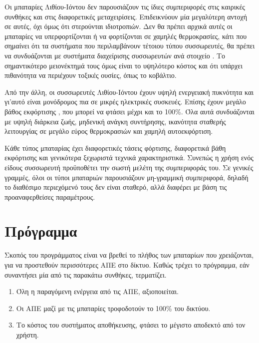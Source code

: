 \documentclass[12pt]{report}
\begin{document}
Οι μπαταρίες Λιθίου-Ιόντου δεν παρουσιάζουν τις ίδιες συμπεριφορές στις καιρικές συνθήκες και στις διαφορετικές μεταχειρίσεις. Επιδεικνύουν μία μεγαλύτερη αντοχή σε αυτές, όχι όμως ότι στερούνται ιδιοτροπιών. 
Δεν θα πρέπει αρχικά αυτές οι μπαταρίες να υπερφορτίζονται ή να φορτίζονται σε χαμηλές θερμοκρασίες, κάτι που σημαίνει ότι τα συστήματα που περιλαμβάνουν τέτοιου τύπου συσσωρευτές, θα πρέπει να συνδυάζονται με συστήματα
διαχείρισης συσσωρευτών ανά στοιχείο {}. Το σημαντικότερο μειονέκτημά τους όμως είναι το υψηλότερο κόστος και ότι υπάρχει πιθανότητα να περιέχουν τοξικές ουσίες, όπως το κοβάλτιο.

Από την άλλη, οι συσσωρευτές Λιθίου-Ιόντου έχουν υψηλή ενεργειακή πυκνότητα και γι'αυτό είναι μονόδρομος πια σε μικρές ηλεκτρικές συσκευές. Επίσης έχουν μεγάλο βάθος εκφόρτισης {}, που μπορεί
να φτάσει μέχρι και το 100\%. Όλα αυτά συνδυάζονται με υψηλή διάρκεια ζωής, μηδενική ανάγκη συντήρησης, ικανότητα σταθερής λειτουργίας σε μεγάλο εύρος θερμοκρασιών και χαμηλή αυτοεκφόρτιση.

Κάθε τύπος μπαταρίας έχει διαφορετικές τάσεις φόρτισης, διαφορετικά βάθη εκφόρτισης και γενικότερα ξεχωριστά τεχνικά χαρακτηριστικά. Συνεπώς η χρήση ενός είδους συσσωρευτή προϋποθέτει την σωστή μελέτη της συμπεριφοράς του.
Σε γενικές γραμμές, όλοι οι τύποι μπαταριών παρουσιάζουν μη-γραμμική συμπεριφορά, δηλαδή το διαθέσιμο περιεχόμενό τους δεν είναι σταθερό, αλλά διαφέρει με βάση τις προαναφερθείσες παραμέτρους.

\chapter{Πρόγραμμα}
Σκοπός του προγράμματος είναι να βρεθεί το πλήθος των μπαταρίων που χρειάζονται, για να προστεθούν περισσότερες ΑΠΕ στο δίκτυο. Καθώς τρέχει το πρόγραμμα, εάν συναντήσει μία από τις παρακάτω συνθήκες, τερματίζει.

\begin{enumerate}[label=\roman*.]
				\item Όλη η παραγόμενη ενέργεια από τις ΑΠΕ, αξιοποιείται.
				\item Οι ΑΠΕ μαζί με τις μπαταρίες τροφοδοτούν το 100\% του δικτύου.
				\item Το κόστος του συστήματος αποθήκευσης, φτάσει το μέγιστο αποδεκτό από τον χρήστη.
\end{enumerate}
\end{document}
